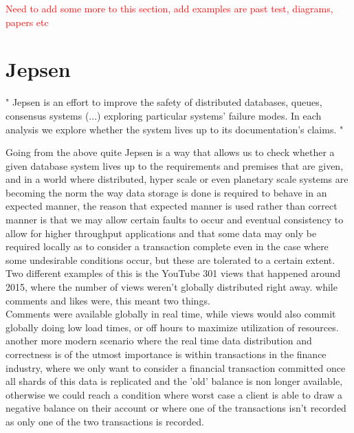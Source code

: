 \documentclass[a4paper,10pt,titlepage]{report}
\begin{document}
\textcolor{red}{Need to add some more to this section, add examples are past test, diagrams, papers etc}

\section{Jepsen}
"
Jepsen is an effort to improve the safety of distributed databases, queues, consensus systems  (...) exploring particular systems' failure modes. In each analysis we explore whether the system lives up to its documentation's claims.
"\cite{jepsonio}
\\
\vspace{5mm}

Going from the above quite Jepsen is a way that allows us to check whether a given database system lives up to the requirements and premises that are given, and in a world where distributed, hyper scale or even planetary scale systems are becoming the norm the way data storage is done is required to behave in an expected manner, the reason that expected manner is used rather than correct manner is that we may allow certain faults to occur and eventual consistency to allow for higher throughput applications and that some data may only be required locally as to consider a transaction complete even in the case where some undesirable conditions occur, but these are tolerated to a certain extent. \\
\vspace{5mm}
Two different examples of this is the YouTube 301 views that happened around 2015, where the number of views weren't globally distributed right away. while comments and likes were, this meant two things. \\

Comments were available globally in real time, while views would also commit globally doing low load times, or off hours to maximize utilization of resources.\\
\vspace{5mm}
another more modern scenario where the real time data distribution and correctness is of the utmost importance is within transactions in the finance industry,  where we only want to consider a financial transaction committed once all shards of this data is replicated and the 'old' balance is non longer available, otherwise we could reach a condition where worst case a client is able to draw a negative balance on their account or where one of the transactions isn't recorded as only one of the two transactions is recorded.\\
\end{document}
